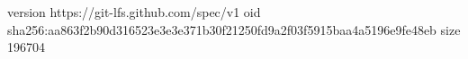 version https://git-lfs.github.com/spec/v1
oid sha256:aa863f2b90d316523e3e3e371b30f21250fd9a2f03f5915baa4a5196e9fe48eb
size 196704

